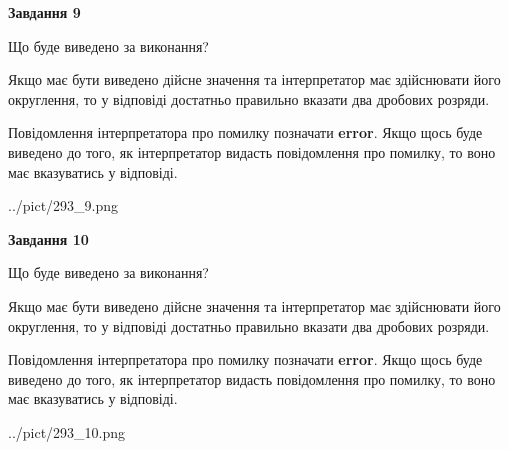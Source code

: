 \documentclass[12pt, ukrainian]{article}
\begin{document}
{\begin {Large}
{\begin {center}\textbf{Завдання 9}\end {center}}\par
Що буде виведено за виконання? \par

Якщо має бути виведено дійсне значення та інтерпретатор має здійснювати його округлення, 
то у відповіді достатньо правильно вказати два дробових розряди.

Повідомлення інтерпретатора про помилку позначати \textbf{error}.
Якщо щось буде виведено до того, як інтерпретатор видасть повідомлення про помилку, 
то воно має вказуватись у відповіді. \par

\begin{center}
	{../pict/293_9.png}
\end{center}
\newpage

{\begin {center}\textbf{Завдання 10}\end {center}}\par
Що буде виведено за виконання? \par

Якщо має бути виведено дійсне значення та інтерпретатор має здійснювати його округлення, 
то у відповіді достатньо правильно вказати два дробових розряди.

Повідомлення інтерпретатора про помилку позначати \textbf{error}.
Якщо щось буде виведено до того, як інтерпретатор видасть повідомлення про помилку, 
то воно має вказуватись у відповіді. \par

\begin{center}
	{../pict/293_10.png}
\end{center}
\newpage

\end {Large}}
\end{document}
